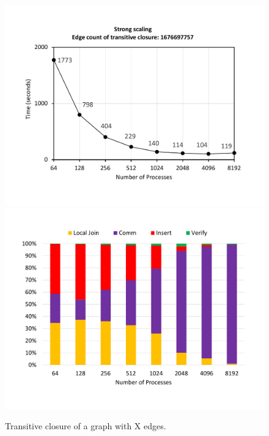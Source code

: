 
\begin{figure}[t]
	{\includegraphics[width=.50\textwidth,  trim={0cm 0cm 0cm 0cm, 
			clip}]{results/TC_1_final.pdf}}\hfill%
	{\includegraphics[width=.50\textwidth,  trim={0cm 0cm 0cm 0cm,
			clip}]{results/TC_1_break_down_final.pdf}}\hfill%
	\centering
	\caption{Transitive closure of a graph with X edges.}
	\label{fig:tc_small}
\end{figure}


